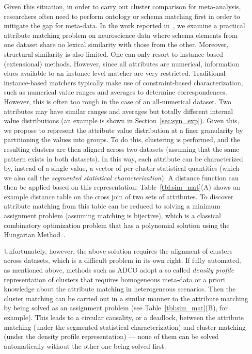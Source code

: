 Given this situation, in order to carry out cluster comparison for meta-analysis, researchers often need to perform ontology or schema matching first in order to mitigate the gap for meta-data. In the work reported in~\cite{LiuEtal10}, we examine a practical attribute matching problem on neuroscience data where schema elements from one dataset share no lexical similarity with those from the other. Moreover, structural similarity is also limited. One can only resort to instance-based (extensional) methods. However, since all attributes are numerical, information clues available to an instance-level matcher are very restricted. Traditional instance-based matchers typically make use of constraint-based characterization, such as numerical value ranges and averages to determine correspondences. However, this is often too rough in the case of an all-numerical dataset. Two attributes may have similar ranges and averages but totally different internal value distributions (an example is shown in Section~\ref{sec:syn_exp}). Given this, we propose to represent the attribute value distribution at a finer granularity by partitioning the values into groups. To do this, clustering is performed, and the resulting clusters are then aligned across two datasets (assuming that the same pattern exists in both datasets). In this way, each attribute can be characterized by, instead of a single value, a vector of per-cluster statistical quantities (which we also call the \emph{segmented statistical characterization}). A distance function can then be applied based on this representation. Table~\ref{tbl:sim_mat}(A) shows an example distance table on the cross join of two sets of attributes. To discover attribute matching from this table can be reduced to solving a minimum assignment problem (assuming matching is bijective), which is a classical combinatory optimization problem that has a polynomial solution using the Hungarian Method~\cite{Kuhn1955}.

Unfortunately, however, the above solution requires the alignment of clusters across datasets, which is a difficult problem in its own right. If fully automated, as mentioned above, methods such as ADCO adopt a so called \emph{density profile}~\cite{Bae2010} representation of clusters that requires homogeneous meta-data or a priori knowledge about the attribute matching in heterogeneous scenarios. Then the cluster matching can be carried out in a similar manner to the attribute matching by being solved as an assignment problem (see Table~\ref{tbl:sim_mat}(B), for example). This leads to a circular causality, or a deadlock, between the attribute matching (under the segmented statistical characterization) and cluster matching (under the density profile representation) --- none of them can be solved automatically without the other one being solved first.


